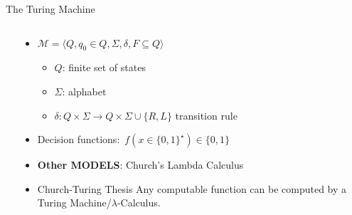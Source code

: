 \documentclass[usenames,dvipsnames]{beamer}
\newcommand{\cM}{\mathcal{M}}
\newcommand\ldiaarg[1]{\langle#1\rangle}
\begin{document}
\begin{frame}{The Turing Machine}
    \begin{columns}
        \begin{column}{0.3\textwidth}
        \end{column}
        \begin{column}{0.7\textwidth}
            \begin{itemize}
                \item $\cM = \ldiaarg{Q,q_0\in Q, \Sigma, \delta, F\subseteq Q}$
                    \begin{itemize}
                        \item $Q$: finite set of states
                        \item $\Sigma$: alphabet
                        \item $\delta:Q\times\Sigma\rightarrow Q\times\Sigma\cup\{R,L\}$ transition rule
                    \end{itemize}
                \item Decision functions:~$f(x\in\{0,1\}^\star)\in\{0,1\}$
                \item \textbf{Other MODELS}: Church's Lambda Calculus
                \item[]
                
                \begin{block}{Church-Turing Thesis}
                    Any computable function can be computed by a Turing Machine/$\lambda$-Calculus.
                \end{block}

            \end{itemize}
        \end{column}
    \end{columns}
\end{frame}
\end{document}
